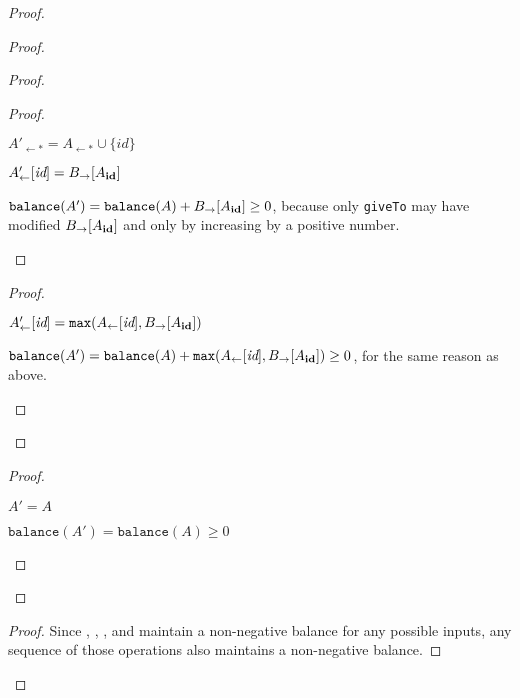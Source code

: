 \documentclass[9pt, oneside]{article}   	%
\begin{document}
\begin{proof}
	\begin{proof}
		\begin{proof}
			\begin{proof}
				\begin{pfenum}
					\item $A'_{\leftarrow *} = A_{\leftarrow *} \cup \{ \textit{id} \}$
					\item $A'_\leftarrow [\textit{id}] = B_{\rightarrow}[A_{\scriptsize\textbf{id}}]$
					\item $\texttt{balance}(A') = \texttt{balance}(A) +  B_{\rightarrow}[A_{\scriptsize\textbf{id}}] \geq 0$, because only \texttt{giveTo} may have modified $B_{\rightarrow}[A_{\scriptsize\textbf{id}}]$ and only by increasing by a positive number. 
				\end{pfenum}
			\end{proof}
			
			\begin{proof}
				\begin{pfenum}
					\item $A'_\leftarrow [\textit{id}] = \texttt{max}(A_\leftarrow [\textit{id}], B_{\rightarrow}[A_{\scriptsize\textbf{id}}])$
					\item $\texttt{balance}(A') = \texttt{balance}(A) +  \texttt{max}(A_\leftarrow [\textit{id}], B_{\rightarrow}[A_{\scriptsize\textbf{id}}]) \geq 0$, for the same reason as above.
				\end{pfenum}
			\end{proof}

			
		\end{proof}
		
		\begin{proof}
			\begin{pfenum}
				\item $A' = A$
				\item $\texttt{balance}(A') = \texttt{balance}(A) \geq 0$
			\end{pfenum}
		\end{proof}		
	\end{proof}

	\qedstep
	\begin{proof}
		Since , , , and  maintain a non-negative balance for any possible inputs, any sequence of those operations also maintains a non-negative balance.
	\end{proof}
\end{proof}
\end{document}
